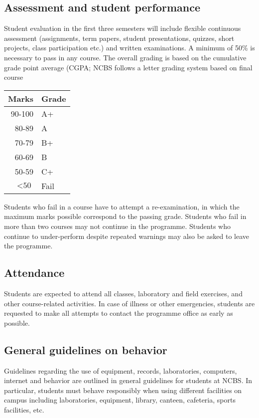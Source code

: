 \documentclass[a4paper]{extarticle}
\begin{document}
\subsection{Assessment and student performance}
Student evaluation in the first three semesters will
include flexible continuous assessment (assignments, term papers, student presentations,
quizzes, short projects, class participation etc.) and written examinations. A minimum of
50\% is necessary to pass in any course. The overall grading is based on the cumulative
grade point average (CGPA; NCBS follows a letter grading system based on final course

\begin{table}[ht!]
    \begin{tabular}{r l}
        \toprule
        Marks & Grade \\
        \midrule
        90-100 & A+ \\
        80-89 & A \\
        70-79 & B+ \\
        60-69 & B \\
        50-59 & C+ \\
        $< \text{50}$  & Fail \\
        \bottomrule
    \end{tabular} 
    \label{table:grading_scheme}
\end{table}

Students who fail in a course have to attempt a re-examination, in which the maximum
marks possible correspond to the passing grade. Students who fail in more than two courses
may not continue in the programme. Students who continue to under-perform despite
repeated warnings may also be asked to leave the programme.

\subsection{Attendance} Students are expected to attend all classes, laboratory
and field exercises, and other course-related activities. In case of illness or
other emergencies, students are requested to make all attempts to contact the
programme office as early as possible.

\subsection{General guidelines on behavior} Guidelines regarding the use of
equipment, records, laboratories, computers, internet and behavior are outlined
in general guidelines for students at NCBS. In particular, students must behave
responsibly when using different facilities on campus including laboratories,
equipment, library, canteen, cafeteria, sports facilities, etc.
\end{document}
